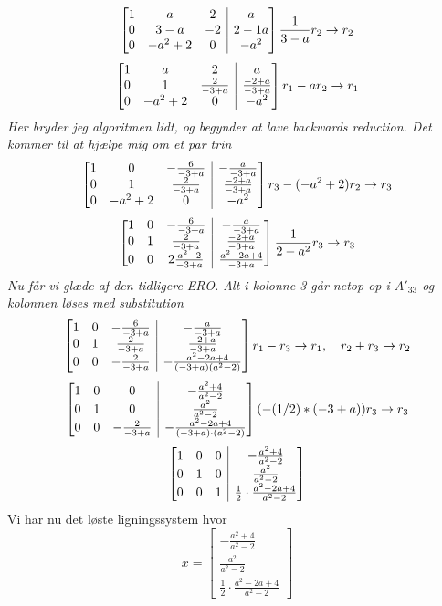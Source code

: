 \documentclass[a4paper,fleqn]{article}
\begin{document}
	\[ \left[\begin{array}{@{}ccc|c@{}}
		1	&	a	&	2	& a\\
		0	&	3 - a	&	-2	& 2-1a\\
		0	&	-a^2+2	&	0	& -a^2
	\end{array} \right] \frac{1}{3-a}r_2 \rightarrow r_2 \]
	\[ \left[\begin{array}{@{}ccc|c@{}}
		1	&	a		&	2		& a\\
		0	&	1		&	\frac{2}{-3+a}	& \frac{-2+a}{-3+a}\\
		0	&	-a^2+2		&	0		& -a^2
	\end{array} \right] r_1 - ar_2 \rightarrow r_1 \]
	\emph{Her bryder jeg algoritmen lidt, og begynder at lave backwards reduction. Det kommer
	til at hjælpe mig om et par trin}
	\[ \left[\begin{array}{@{}ccc|c@{}}
		1	&	0		&	-\frac{6}{-3+a}	& -\frac{a}{-3+a}\\
		0	&	1		&	\frac{2}{-3+a}	& \frac{-2+a}{-3+a}\\
		0	&	-a^2+2		&	0		& -a^2
	\end{array} \right] r_3 - (-a^2+2)r_2 \rightarrow r_3 \]
	\[ \left[\begin{array}{@{}ccc|c@{}}
		1	&	0		&	-\frac{6}{-3+a}	& -\frac{a}{-3+a}\\
		0	&	1		&	\frac{2}{-3+a}	& \frac{-2+a}{-3+a}\\
		0	&	0		&	2\frac{a^2-2}{-3+a}		& \frac{a^2-2a+4}{-3+a}
\end{array} \right] \frac{1}{2 - a^2} r_3 \rightarrow r_3 \]
\emph{Nu får vi glæde af den tidligere ERO. Alt i kolonne 3 går netop op i $A'_{33}$ og kolonnen løses med substitution}
	\[ \left[\begin{array}{@{}ccc|c@{}}
		1	&	0		&	-\frac{6}{-3+a}	& -\frac{a}{-3+a}\\
		0	&	1		&	\frac{2}{-3+a}	& \frac{-2+a}{-3+a}\\
		0	&	0		&	-\frac{2}{-3+a}	& -\frac{a^2-2a+4}{(-3+a)(a^2-2)}
\end{array} \right] r_1 - r_3 \rightarrow r_1, \quad r_2 + r_3 \rightarrow r_2 \]
	\[ \left[\begin{array}{@{}ccc|c@{}}
		1	&	0		&	0		& -\frac{a^2+4}{a^2 -2}\\
		0	&	1		&	0		& \frac{a^2}{a^2-2}\\
		0	&	0		&	-\frac{2}{-3+a}	& -\frac{a^2-2a+4}{(-3+a)\cdot(a^2-2)}
\end{array} \right] (-(1/2)*(-3+a))r_3 \rightarrow r_3\]
	\[ \left[\begin{array}{@{}ccc|c@{}}
		1	&	0		&	0		& -\frac{a^2+4}{a^2 -2}\\
		0	&	1		&	0		& \frac{a^2}{a^2-2}\\
		0	&	0		&	1		& \frac{1}{2}\cdot\frac{a^2-2a+4}{a^2-2}
\end{array} \right] \]
Vi har nu det løste ligningssystem hvor
\[ x = \begin{bmatrix}
		-\frac{a^2+4}{a^2 -2}\\
		\frac{a^2}{a^2-2}\\
		\frac{1}{2}\cdot\frac{a^2-2a+4}{a^2-2}
\end{bmatrix}\]
\end{document}
